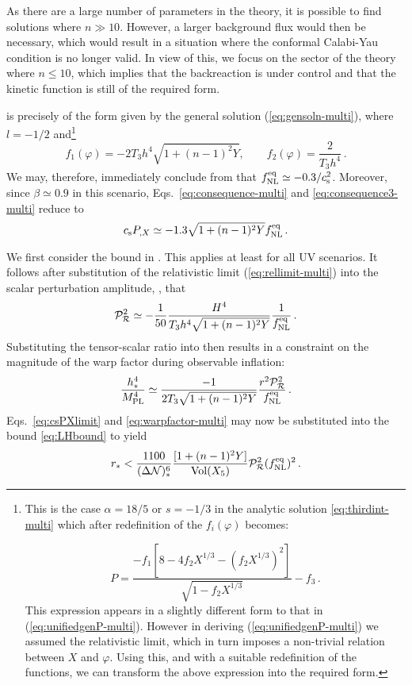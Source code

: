 As there are a large
number of 
parameters in the theory, it is possible to find solutions 
where $n \gg 10$. However, a larger background flux would then be necessary, which
would result 
in a situation where the conformal 
Calabi-Yau condition is no longer valid. In view of this, we focus on
the sector of the theory where $n \le 10$, which implies that the 
backreaction is under control and that the kinetic function
is still of the required form. 


 is precisely of the form given by the 
general solution (\ref{eq:gensoln-multi}), where $l=-1/2$ 
and\footnote{This is the
case $\alpha =18/5$ or $s=-1/3$ in the analytic solution
\eqref{eq:thirdint-multi} which after redefinition of the $f_i (\varphi)$
becomes:
% 

\begin{equation}
P = \frac{-f_1\left[8 - 4f_2X^{1/3}
-\left(f_2X^{1/3}\right)^2\right]}{\sqrt{1-f_2X^{1/3}}} -f_3 \, .
\end{equation}
% 
This expression appears in a slightly different 
form to that in (\ref{eq:unifiedgenP-multi}). 
However in deriving (\ref{eq:unifiedgenP-multi}) we assumed the
relativistic limit, which in turn imposes a non-trivial 
relation between $X$ and $\varphi$. Using this, and with a 
suitable redefinition of the functions, we can
transform the above expression into the required form.} 
% 
\begin{equation}
\label{eq:fdefns-multi}
f_1 (\varphi) = -2T_3 h^4 \sqrt{1+(n-1)^2Y} , \qquad 
f_2 (\varphi) = \frac{2}{T_3 h^4} \,.
\end{equation}
% 
We may, therefore, immediately conclude from  that
$f_{\mathrm{NL}}^{\mathrm{eq}}
\simeq -0.3/c_\mathrm{s}^2$. Moreover, since $\beta \simeq 0.9$ in this scenario, 
Eqs.~\eqref{eq:consequence-multi} and \eqref{eq:consequence3-multi} reduce to  
% 
\begin{equation}
\label{eq:csPXlimit}
c_\mathrm{s} P_{,X} \simeq -1.3 \sqrt{1+(n-1)^2Y} f_{\mathrm{NL}}^{\mathrm{eq}} \,.
\end{equation}
% 


We first consider the bound in . This applies at least for all
UV scenarios. It follows after substitution of the relativistic limit
(\ref{eq:rellimit-multi}) into the scalar perturbation amplitude,
,
that 
% 
\begin{equation}
\label{eq:usefulPs-multi}
\mathcal{P}_{\mathcal{R}}^2  \simeq -\frac{1}{50} \frac{H^4}{T_3 h^4\sqrt{1+(n-1)^2Y}}
\frac{1}{f_{\mathrm{NL}}^{\mathrm{eq}}}\,.
\end{equation}
% 
Substituting the tensor-scalar ratio into  
 then results in a constraint on the magnitude of 
the warp factor during observable inflation:
%  
\begin{equation}
\label{eq:warpfactor-multi}
\frac{h^4_*}{M_{\mathrm{PL}}^4} \simeq \frac{-1}{2 T_3 \sqrt{1+(n-1)^2Y}} 
\frac{r^2 \mathcal{P}_{\mathcal{R}}^2 }{f_{\mathrm{NL}}^{\mathrm{eq}}} \,.
\end{equation}
% 
Eqs.~\eqref{eq:csPXlimit} and \eqref{eq:warpfactor-multi} may now be
substituted into 
the bound \eqref{eq:LHbound} to yield
%  
\begin{equation}
\label{eq:actualLH-multi}
r_* < \frac{1100}{(\Delta \mathcal{N} )_*^6} 
\frac{[1+(n-1)^2Y]}{\mathrm{Vol} (X_5)} \mathcal{P}_{\mathcal{R}}^2  (f_{\mathrm{NL}}^{\mathrm{eq}})^2 \,.
\end{equation}
% 


